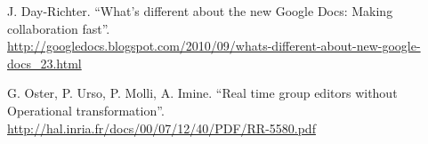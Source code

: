 \documentclass[a4paper, 12pt, twoside]{book}
\begin{document}
\begin{thebibliography}{99}
 J. Day-Richter. “What’s different about the new Google Docs: Making collaboration fast”.
\\\url{http://googledocs.blogspot.com/2010/09/whats-different-about-new-google-docs_23.html}

 G. Oster, P. Urso, P. Molli, A. Imine. “Real time group editors without Operational transformation”.
\\\url{http://hal.inria.fr/docs/00/07/12/40/PDF/RR-5580.pdf}

\end{thebibliography}

\end{document}
